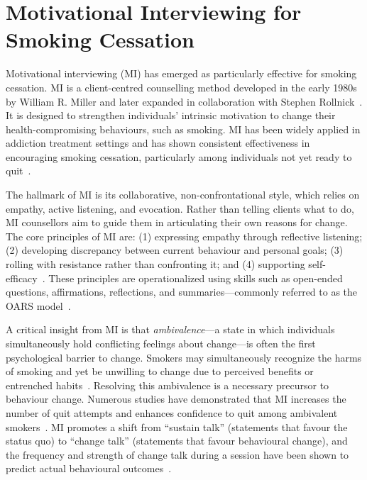 \section{Motivational Interviewing for Smoking Cessation}

Motivational interviewing (MI) has emerged as particularly effective for smoking cessation. MI is a client-centred counselling method developed in the early 1980s by William R. Miller and later expanded in collaboration with Stephen Rollnick~\cite{miller1991motivational,MillerRollnick2023}. It is designed to strengthen individuals' intrinsic motivation to change their health-compromising behaviours, such as smoking. MI has been widely applied in addiction treatment settings and has shown consistent effectiveness in encouraging smoking cessation, particularly among individuals not yet ready to quit~\cite{bischof2021evidence,doi:10.1177/1049731509347850}.

The hallmark of MI is its collaborative, non-confrontational style, which relies on empathy, active listening, and evocation. Rather than telling clients what to do, MI counsellors aim to guide them in articulating their own reasons for change. The core principles of MI are: (1) expressing empathy through reflective listening; (2) developing discrepancy between current behaviour and personal goals; (3) rolling with resistance rather than confronting it; and (4) supporting self-efficacy~\cite{rollnick2008motivational}. These principles are operationalized using skills such as open-ended questions, affirmations, reflections, and summaries---commonly referred to as the OARS model~\cite{Miller_2023}.


A critical insight from MI is that \emph{ambivalence}---a state in which individuals simultaneously hold conflicting feelings about change---is often the first psychological barrier to change. Smokers may simultaneously recognize the harms of smoking and yet be unwilling to change due to perceived benefits or entrenched habits~\cite{brown2023mi}. Resolving this ambivalence is a necessary precursor to behaviour change. Numerous studies have demonstrated that MI increases the number of quit attempts and enhances confidence to quit among ambivalent smokers~\cite{Abar2013, Gwaltney2009-wj}. MI promotes a shift from ``sustain talk'' (statements that favour the status quo) to ``change talk'' (statements that favour behavioural change), and the frequency and strength of change talk during a session have been shown to predict actual behavioural outcomes~\cite{Apodaca2009}.

